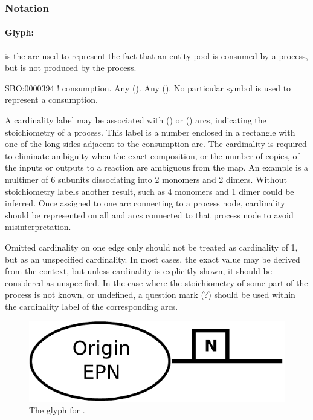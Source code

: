 \subsubsection{Notation}

\paragraph{Glyph: }
\label{sec:consumption}

 is the arc used to represent the fact that an entity pool is consumed by a process,
but is not produced by the process.

\begin{glyphDescription}
 \glyphSboTerm SBO:0000394 ! consumption.
 \glyphOrigin Any  ().
 \glyphTarget Any  ().
 \glyphEndPoint No particular symbol is used to represent a consumption.
\end{glyphDescription}


A cardinality label may be associated with 
() or  () arcs,
indicating the stoichiometry of a process. This label is a number
enclosed in a rectangle with one of the long sides adjacent to the
consumption arc. The cardinality is required to eliminate ambiguity
when the exact composition, or the number of copies, of the inputs or
outputs to a reaction are ambiguous from the map.  An example is a
multimer of 6 subunits dissociating into 2 monomers and 2
dimers. Without stoichiometry labels another result, such as 4
monomers and 1 dimer could be inferred.  Once assigned to one arc
connecting to a process node, cardinality should be represented on all
 and  arcs connected to that
process node to avoid misinterpretation.

Omitted cardinality on one edge only should not be treated as cardinality of 1, but
as an unspecified cardinality. In most cases, the exact value may be derived from the
context, but unless cardinality is explicitly shown, it should be considered as
unspecified. In the case where the stoichiometry of some part of the process is not
known, or undefined, a question mark (?) should be used within the cardinality label
of the corresponding arcs.

\begin{figure}[H]
  \centering
  \includegraphics[scale = 0.4]{images/consumption}
  \caption{The \PD glyph for .}
  \label{fig:consumption}
\end{figure}


